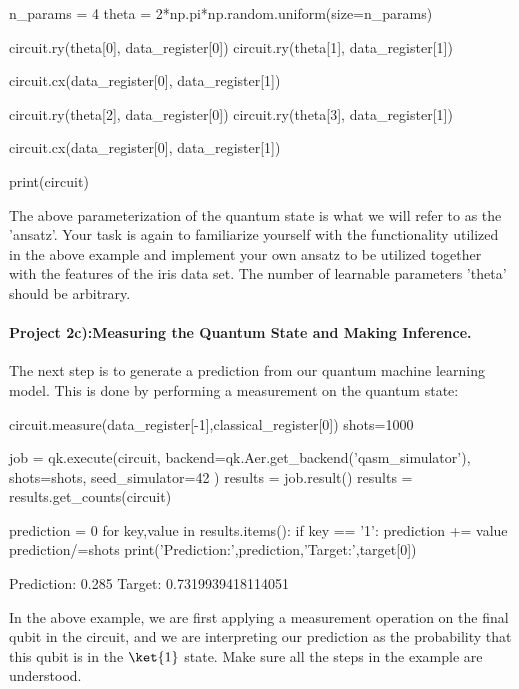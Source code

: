 \documentclass[%
oneside,                 %
final,                   %
10pt]{article}
\begin{document}
\begin{print}
n_params = 4
theta = 2*np.pi*np.random.uniform(size=n_params)

circuit.ry(theta[0], data_register[0])
circuit.ry(theta[1], data_register[1])

circuit.cx(data_register[0], data_register[1])

circuit.ry(theta[2], data_register[0])
circuit.ry(theta[3], data_register[1])

circuit.cx(data_register[0], data_register[1])

print(circuit)
\end{print}

The above parameterization of the quantum state is what we will refer
to as the 'ansatz'. Your task is again to familiarize yourself with
the functionality utilized in the above example and implement your own
ansatz to be utilized together with the features of the
iris data set. The number of learnable parameters 'theta'
should be arbitrary.



\paragraph{Project 2c):Measuring the Quantum State and Making Inference.}
The next step is to generate a prediction from our quantum machine learning model. This is done by performing a measurement on the quantum state:

\begin{print}
circuit.measure(data_register[-1],classical_register[0])
shots=1000

job = qk.execute(circuit,
                backend=qk.Aer.get_backend('qasm_simulator'),
                shots=shots,
                seed_simulator=42
                )
results = job.result()
results = results.get_counts(circuit)

prediction = 0
for key,value in results.items():
    if key == '1':
        prediction += value
prediction/=shots
print('Prediction:',prediction,'Target:',target[0])
\end{print}
\begin{print}
    Prediction: 0.285 Target: 0.7319939418114051
\end{print}

In the above example, we are first applying a measurement operation on
the final qubit in the circuit, and we are interpreting our prediction
as the probability that this qubit is in the $\ket{1}$ state. Make
sure all the steps in the example are understood.
\end{document}
